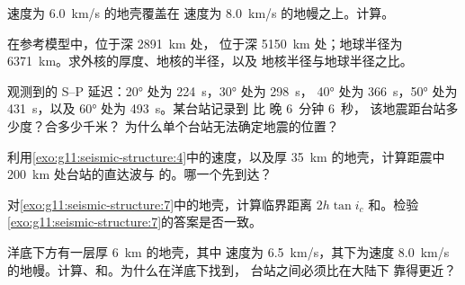 \begin{exercise}[$\star$]\label{exo:g11:seismic-structure:4}
速度为 \qty{6.0}{km/s} 的地壳覆盖在
速度为 \qty{8.0}{km/s} 的地幔之上。计算。
\end{exercise}

\begin{exercise}[$\star$]\label{exo:g11:seismic-structure:5}
在参考模型中，位于深 \qty{2891}{km} 处，
位于深 \qty{5150}{km} 处；地球半径为
\qty{6371}{km}。求外核的厚度、地核的半径，以及
地核半径与地球半径之比。
\end{exercise}

\begin{exercise}[$\star\star$]\label{exo:g11:seismic-structure:6}
观测到的 S--P 延迟：\ang{20} 处为 \qty{224}{s}，\ang{30} 处为 \qty{298}{s}，
\ang{40} 处为 \qty{366}{s}，\ang{50} 处为 \qty{431}{s}，以及
\ang{60} 处为 \qty{493}{s}。某台站记录到 比 晚 6~分钟 6~秒，
该地震距台站多少度？合多少千米？
为什么单个台站无法确定地震的位置？
\end{exercise}

\begin{exercise}[$\star\star$]\label{exo:g11:seismic-structure:7}
利用\cref{exo:g11:seismic-structure:4}中的速度，以及厚
\qty{35}{km} 的地壳，计算距震中 \qty{200}{km} 处台站的直达波与
的。哪一个先到达？
\end{exercise}

\begin{exercise}[$\star\star$]\label{exo:g11:seismic-structure:8}
对\cref{exo:g11:seismic-structure:7}中的地壳，计算临界距离
$2h\tan i_c$ 和。检验
\cref{exo:g11:seismic-structure:7}的答案是否一致。
\end{exercise}

\begin{exercise}[$\star\star$]\label{exo:g11:seismic-structure:9}
洋底下方有一层厚 \qty{6}{km} 的地壳，其中 速度为
\qty{6.5}{km/s}，其下为速度 \qty{8.0}{km/s} 的地幔。计算、和。为什么在洋底下找到，
台站之间必须比在大陆下
靠得更近？
\end{exercise}


